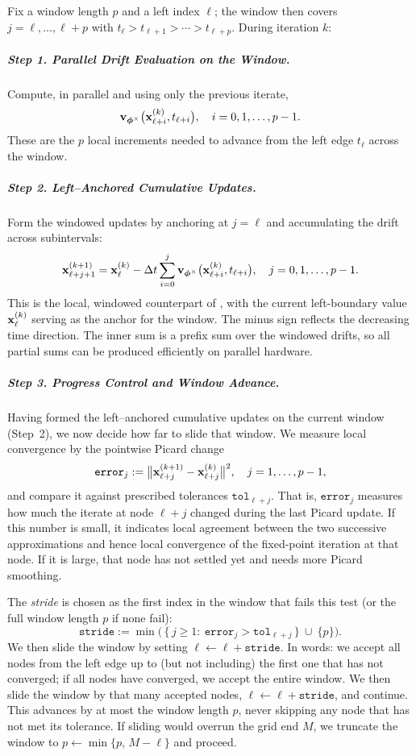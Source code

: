 Fix a window length $p$ and a left index $\ell$; the window then covers
$j=\ell,\ldots,\ell+p$ with $t_\ell>t_{\ell+1}>\cdots>t_{\ell+p}$. During
iteration $k$:

\subparagraph{Step 1. Parallel Drift Evaluation on the Window.}
Compute, in parallel and using only the previous iterate,
\[
{\mathbf{v}}_{{\bm{\phi}}^\times} \big({\mathbf{x}}^{(k)}_{\ell+i}, t_{\ell+i}\big),
\quad i=0,1,\ldots,p-1.
\]
These are the $p$ local increments needed to advance from the left edge
$t_\ell$ across the window.

\subparagraph{Step 2. Left–Anchored Cumulative Updates.}
Form the windowed updates by anchoring at $j=\ell$ and accumulating the drift across subintervals:
\begin{equation}\label{eq:window_update}
{\mathbf{x}}^{(k+1)}_{\ell+j+1}
 = 
{\mathbf{x}}^{(k)}_{\ell}
 - \Delta t \sum_{i=0}^{j}
{\mathbf{v}}_{{\bm{\phi}}^\times} \big({\mathbf{x}}^{(k)}_{\ell+i}, t_{\ell+i}\big),
\quad j=0,1,\ldots,p-1.
\end{equation}
This is the local, windowed counterpart of
, with the current left-boundary value
${\mathbf{x}}^{(k)}_\ell$ serving as the anchor for the window. The minus sign
reflects the decreasing time direction. The inner sum is a prefix sum over
the windowed drifts, so all partial sums can be produced efficiently on
parallel hardware.

\subparagraph{Step 3. Progress Control and Window Advance.}
Having formed the left–anchored cumulative updates on the current window (Step~2),
we now decide how far to slide that window. We measure local convergence
by the pointwise Picard change
\[
\mathtt{error}_j
:=
\big\|{\mathbf{x}}^{(k+1)}_{\ell+j}-{\mathbf{x}}^{(k)}_{\ell+j}\big\|^2,
\quad j=1,\ldots,p-1,
\]
and compare it against prescribed tolerances $\mathtt{tol}_{\ell+j}$. That is, $\mathtt{error}_j$ measures how much the iterate at node $\ell+j$ changed during the last Picard
update. If this number is small, it indicates local agreement between the two
successive approximations and hence local convergence of the fixed-point
iteration at that node. If it is large, that node has not settled yet and needs
more Picard smoothing.


The \emph{stride} is chosen as the first index in the window that fails this
test (or the full window length $p$ if none fail):
\[
\mathtt{stride}
:=
\min\Big(\,\{\,j\ge 1:\ \mathtt{error}_j>\mathtt{tol}_{\ell+j}\,\}\ \cup\ \{p\}\Big).
\]
We then slide the window by setting $\ell \leftarrow \ell+\mathtt{stride}$.  In words: we accept all nodes from the left edge up to (but not including) the
first one that has not converged; if all nodes have converged, we accept the
entire window. We then slide the window by that many accepted nodes,
$\ell \leftarrow \ell+\mathtt{stride}$, and continue. This advances by at
most the window length $p$, never skipping any node that has not met its
tolerance. If sliding would overrun the grid end $M$, we truncate the window to
$p \leftarrow \min\{p,\,M-\ell\}$ and proceed.



